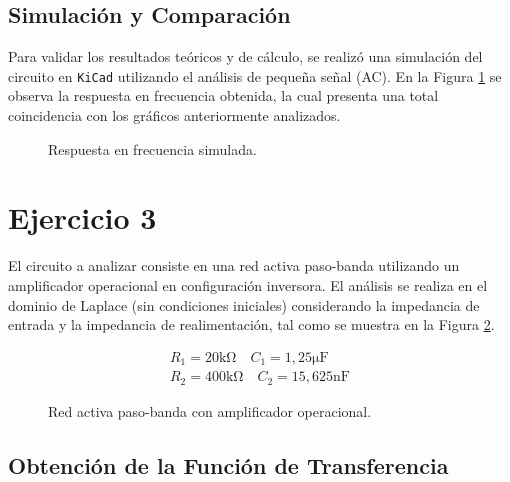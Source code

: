 \subsection{Simulación y Comparación}

Para validar los resultados teóricos y de cálculo, se realizó una simulación del circuito en \texttt{KiCad} utilizando
el análisis de pequeña señal (AC). En la Figura \ref{fig:ej2_simulacion_kicad} se observa la respuesta en frecuencia
obtenida, la cual presenta una total coincidencia con los gráficos anteriormente analizados.

\begin{figure}[!ht]
    \centering
    
    \caption{Respuesta en frecuencia simulada.}
    \label{fig:ej2_simulacion_kicad}
\end{figure}

\clearpage

\section{Ejercicio 3}

El circuito a analizar consiste en una red activa paso-banda utilizando un amplificador operacional en configuración
inversora. El análisis se realiza en el dominio de Laplace (sin condiciones iniciales) considerando la impedancia de
entrada y la impedancia de realimentación, tal como se muestra en la Figura \ref{crkt:ej3_esquematico}.

\begin{figure}[!ht]
    \centering
    \begin{subfigure}[c]{0.5\textwidth}
        \centering
        
    \end{subfigure}
    \hfill
    \begin{subfigure}[c]{0.45\textwidth}
        \begin{gather*}
            R_1 = 20 \si{\kilo\ohm} \quad C_1 = 1,25 \si{\micro\farad} \\
            R_2 = 400 \si{\kilo\ohm} \quad C_2 = 15,625 \si{\nano\farad}
        \end{gather*}
    \end{subfigure}
    \caption{Red activa paso-banda con amplificador operacional.}
    \label{crkt:ej3_esquematico}
\end{figure}

\subsection{Obtención de la Función de Transferencia}

